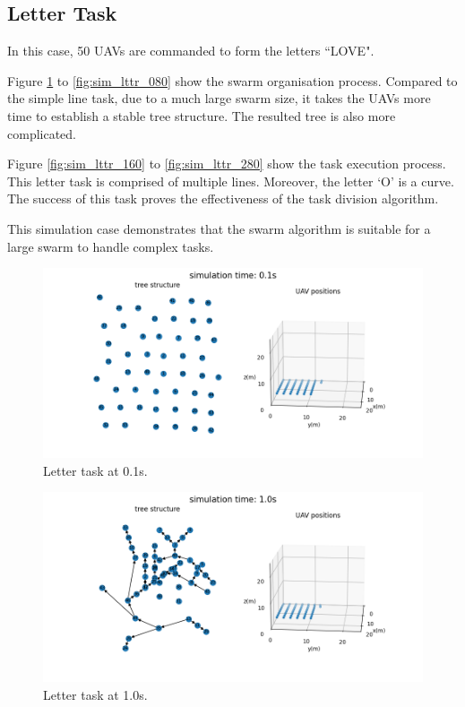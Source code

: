 \subsection{Letter Task}

In this case, 50 UAVs are commanded to form the letters ``LOVE".

Figure \ref{fig:sim_lttr_001} to \ref{fig:sim_lttr_080} show the swarm organisation process.
Compared to the simple line task, due to a much large swarm size,
it takes the UAVs more time to establish a stable tree structure.
The resulted tree is also more complicated.

Figure \ref{fig:sim_lttr_160} to \ref{fig:sim_lttr_280} show the task execution process.
This letter task is comprised of multiple lines. Moreover, the letter `O' is a curve.
The success of this task proves the effectiveness of the task division algorithm.

This simulation case demonstrates that
the swarm algorithm is suitable for a large swarm to handle complex tasks.

\begin{figure}[htbp]
  \centering
  \includegraphics[width=0.96\linewidth]{rsc/lttr.01.png}
  \caption{Letter task at 0.1s.}
  \label{fig:sim_lttr_001}
\end{figure}

\begin{figure}[htbp]
  \centering
  \includegraphics[width=0.96\linewidth]{rsc/lttr.04.png}
  \caption{Letter task at 1.0s.}
  \label{fig:sim_lttr_010}
\end{figure}

